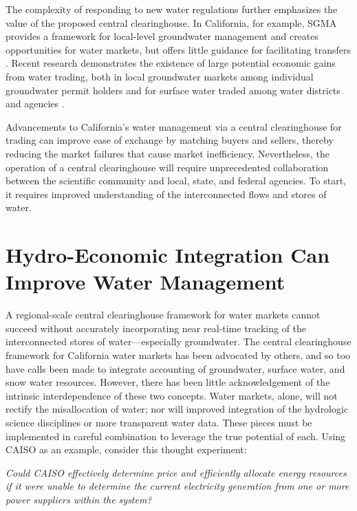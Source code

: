 The complexity of responding to new water regulations further emphasizes the value of the proposed central clearinghouse. In California, for example, SGMA provides a framework for local-level groundwater management \citep{kiparsky_importance_2017} and creates opportunities for water markets, but offers little guidance for facilitating transfers \citep{green_nylen_trading_2017}. Recent research demonstrates the existence of large potential economic gains from water trading, both in local groundwater markets among individual groundwater permit holders \citep{ellen_m._bruno_gains_2018} and for surface water traded among water districts and agencies \citep{nick_hagerty_liquid_2018}.

Advancements to California’s water management via a central clearinghouse for trading can improve ease of exchange by matching buyers and sellers, thereby reducing the market failures that cause market inefficiency. Nevertheless, the operation of a central clearinghouse will require unprecedented collaboration between the scientific community and local, state, and federal agencies. To start, it requires improved understanding of the interconnected flows and stores of water.

\section{Hydro-Economic Integration Can Improve Water Management}

A regional-scale central clearinghouse framework for water markets cannot succeed without accurately incorporating near real-time tracking of the interconnected stores of water—especially groundwater. The central clearinghouse framework for California water markets has been advocated by others, and so too have calls been made to integrate accounting of groundwater, surface water, and snow water resources. However, there has been little acknowledgement of the intrinsic interdependence of these two concepts. Water markets, alone, will not rectify the misallocation of water; nor will improved integration of the hydrologic science disciplines or more transparent water data. These pieces must be implemented in careful combination to leverage the true potential of each. Using CAISO as an example, consider this thought experiment:

\begin{adjustwidth}{1.5cm}{}
\textit{Could CAISO effectively determine price and efficiently allocate energy resources if it were unable to determine the current electricity generation from one or more power suppliers within the system?}
\end{adjustwidth}

